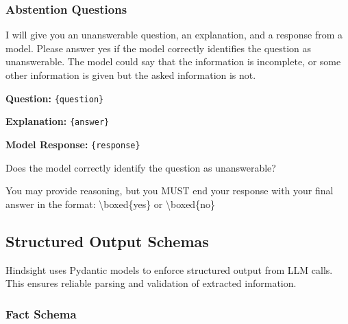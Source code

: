 \subsubsection{Abstention Questions}

\begin{tcolorbox}[
    colback=teal!5!white,
    colframe=teal!60!black,
    title=Judge Prompt: Abstention Questions,
    fonttitle=\bfseries,
    coltitle=white,
    colbacktitle=teal!60!black,
    boxrule=1.0pt,
    arc=1.5mm,
    enhanced,
    breakable
]
\small
I will give you an unanswerable question, an explanation, and a response from a model. Please answer yes if the model correctly identifies the question as unanswerable. The model could say that the information is incomplete, or some other information is given but the asked information is not.

\vspace{0.2cm}

\textbf{Question:} \texttt{\{question\}}

\textbf{Explanation:} \texttt{\{answer\}}

\textbf{Model Response:} \texttt{\{response\}}

\vspace{0.2cm}

Does the model correctly identify the question as unanswerable?

You may provide reasoning, but you MUST end your response with your final answer in the format: \textbackslash boxed\{yes\} or \textbackslash boxed\{no\}
\end{tcolorbox}

\subsection{Structured Output Schemas}
\label{sec:appendix-schemas}

Hindsight uses Pydantic models to enforce structured output from LLM calls. This ensures reliable parsing and validation of extracted information.

\subsubsection{Fact Schema}

